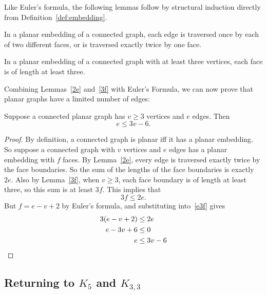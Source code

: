 Like Euler's formula, the following lemmas follow by structural induction
directly from Definition~\ref{def:embedding}.

\begin{lemma}\label{2e}
In a planar embedding of a connected graph, each edge is traversed once by
each of two different faces, or is traversed exactly twice by one face.
\end{lemma}

\begin{lemma}\label{3f}
  In a planar embedding of a connected graph with at least three vertices,
  each face is of length at least three.
\end{lemma}

Combining Lemmas~\ref{2e} and~\ref{3f} with Euler's Formula, we can
now prove that planar graphs have a limited number of edges:

\begin{theorem}\label{th:e3v}
  Suppose a connected planar graph has $v \geq 3$ vertices and $e$
  edges.  Then
\begin{equation}\label{eq:e3v}
    e \leq 3v-6.
\end{equation}
\end{theorem}

\begin{proof}
By definition, a connected graph is planar iff it has a planar embedding.
So suppose a connected graph with $v$ vertices and $e$ edges has a planar
embedding with $f$ faces.  By Lemma~\ref{2e}, every edge is traversed
exactly twice by the face boundaries.  So the sum of the lengths of the
face boundaries is exactly $2e$.  Also by Lemma~\ref{3f}, when $v \geq 3$,
each face boundary is of length at least three, so this sum is at least
$3f$.  This implies that
\begin{equation}\label{e3f}
3f \leq 2e.
\end{equation}
But $f = e-v+2$ by Euler's formula, and substituting into~\eqref{e3f} gives
\begin{align*}
3(e-v+2) & \leq 2e\\
e-3v + 6  & \leq 0\\
e & \leq 3v - 6 \qedhere
\end{align*}
\end{proof}

\subsection{Returning to $K_5$ and $K_{3,3}$}

